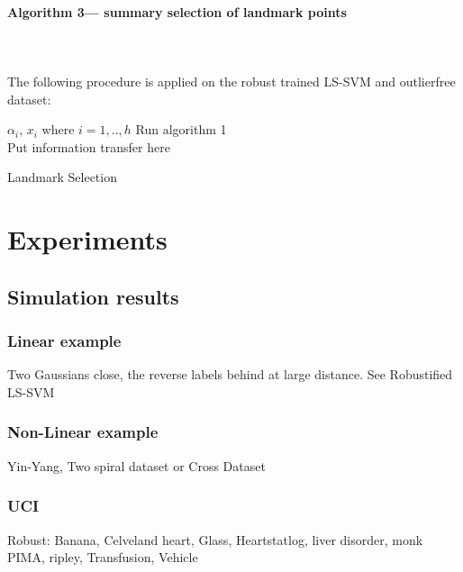 \documentclass[preprint,12pt]{elsarticle}
\begin{document}
\paragraph{Algorithm 3--- summary selection of landmark points} 
\hfill \\\\
The following procedure is applied on the robust trained LS-SVM and outlierfree dataset:


\begin{algorithm}[H]
$\alpha_i$, $x_i$ where $i = 1,..,h$ \gets Run algorithm 1 \\
Put information transfer here \\
\caption{Landmark Selection}\label{Algo:LandmarkSelection}
\end{algorithm}

\section{Experiments} 
\subsection{Simulation results} 

\subsubsection{Linear example}

Two Gaussians close, the reverse labels behind at large distance. See Robustified LS-SVM~\cite{debruyne2009robustified}

\subsubsection{Non-Linear example}

Yin-Yang, Two spiral dataset or Cross Dataset~\cite{yang2014robust}

\subsubsection{UCI}

Robust: Banana, Celveland heart, Glass, Heartstatlog, liver disorder, monk PIMA, ripley, Transfusion, Vehicle~\cite{yang2014robust}
\end{document}
